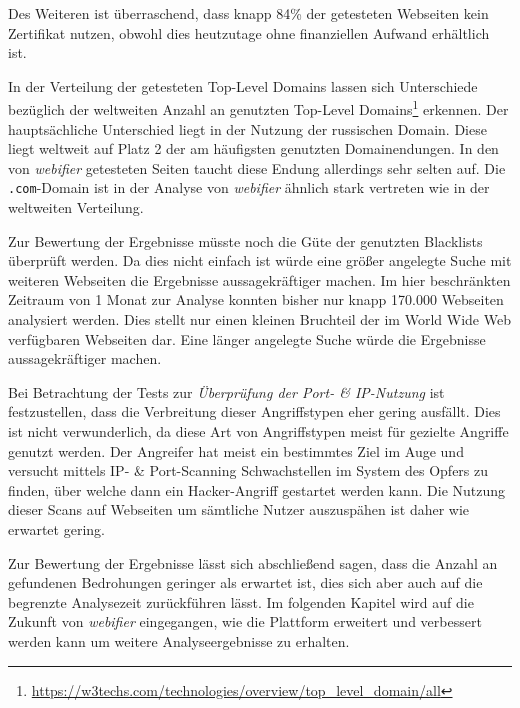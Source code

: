 Des Weiteren ist überraschend, dass knapp 84\% der getesteten Webseiten kein Zertifikat nutzen, obwohl dies heutzutage ohne finanziellen Aufwand erhältlich ist.

In der Verteilung der getesteten Top-Level Domains lassen sich Unterschiede bezüglich der weltweiten
Anzahl an genutzten Top-Level
Domains\footnote{\url{https://w3techs.com/technologies/overview/top_level_domain/all}} erkennen. Der
hauptsächliche Unterschied liegt in der Nutzung der russischen Domain. Diese liegt weltweit auf Platz 2 der am häufigsten genutzten Domainendungen. In den von \textit{webifier} getesteten Seiten taucht diese Endung allerdings sehr selten auf. Die \lstinline[style=eclipse]{.com}-Domain ist in der Analyse von \textit{webifier} ähnlich stark vertreten wie in der weltweiten Verteilung.

Zur Bewertung der Ergebnisse müsste noch die Güte der genutzten Blacklists überprüft werden. Da dies nicht einfach ist würde eine größer angelegte Suche mit weiteren Webseiten die Ergebnisse aussagekräftiger machen. Im hier beschränkten Zeitraum von 1 Monat zur Analyse konnten bisher nur knapp 170.000 Webseiten analysiert werden. Dies stellt nur einen kleinen Bruchteil der im World Wide Web verfügbaren Webseiten dar. Eine länger angelegte Suche würde die Ergebnisse aussagekräftiger machen.

Bei Betrachtung der Tests zur \textit{Überprüfung der Port- \& IP-Nutzung} ist festzustellen, dass die Verbreitung dieser Angriffstypen eher gering ausfällt. Dies ist nicht verwunderlich, da diese Art von Angriffstypen meist für gezielte Angriffe genutzt werden. Der Angreifer hat meist ein bestimmtes Ziel im Auge und versucht mittels IP- \& Port-Scanning Schwachstellen im System des Opfers zu finden, über welche dann ein Hacker-Angriff gestartet werden kann. Die Nutzung dieser Scans auf Webseiten um sämtliche Nutzer auszuspähen ist daher wie erwartet gering.

Zur Bewertung der Ergebnisse lässt sich abschließend sagen, dass die Anzahl an gefundenen Bedrohungen geringer als erwartet ist, dies sich aber auch auf die begrenzte Analysezeit zurückführen lässt. Im folgenden Kapitel wird auf die Zukunft von \textit{webifier} eingegangen, wie die Plattform erweitert und verbessert werden kann um weitere Analyseergebnisse zu erhalten.
